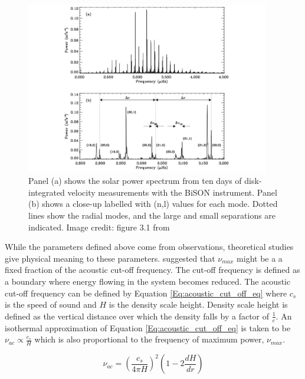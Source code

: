 \begin{figure}
    \centering
    \includegraphics[width=0.95\textwidth]{Figures/1-Introduction/power_spectrum_sun.pdf}
    \caption[Example of solar power spectrum from which asteroseismic analysis can be conducted]{Panel (a) shows the solar power spectrum from ten days of disk-integrated velocity measurements with the BiSON instrument. Panel (b) shows a close-up labelled with (n,l) values for each mode. Dotted lines show the radial modes, and the large and small separations are indicated. Image credit: figure 3.1 from \citet{Palle_Esteban_2014}}
    \label{fig:power_spectrum_example_sun}
\end{figure}

While the parameters defined above come from observations, theoretical studies give physical meaning to these parameters. \citet{Brown_etal_1991} suggested that $\nu_{max}$ might be a a fixed fraction of the acoustic cut-off frequency. The cut-off frequency is defined as a boundary where energy flowing in the system becomes reduced. The acoustic cut-off frequency can be defined by Equation \ref{Eq:acoustic_cut_off_eq} where $c_{s}$ is the speed of sound and $H$ is the density scale height. Density scale height is defined as the vertical distance over which the density falls by a factor of $\frac{1}{e}$. An isothermal approximation of Equation \ref{Eq:acoustic_cut_off_eq} is taken to be $\nu_{ac} \propto \frac{c_{s}}{H}$ which is also proportional to the frequency of maximum power, $\nu_{max}$.

\begin{equation}
    \nu_{ac} = \left(\frac{c_{s}}{4\pi H}\right)^{2}\left(1 - 2\frac{dH}{dr}\right)
    \label{Eq:acoustic_cut_off_eq}
\end{equation}

